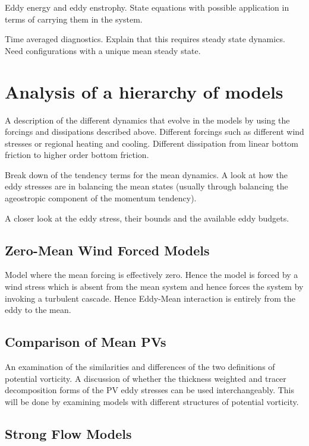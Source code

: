 \documentclass[10pt,a4paper]{article}
\begin{document}
Eddy energy and eddy enstrophy. State equations with 
possible application in terms of carrying them in the system.

Time averaged diagnostics. Explain that this 
requires steady state dynamics. Need configurations
with a unique mean steady state.

\section{Analysis of a hierarchy of models}

A description of the different dynamics that evolve
in the models by using the forcings and 
dissipations described above. Different forcings
such as different wind stresses or regional heating
and cooling. Different dissipation from
linear bottom friction to higher order bottom
friction.

Break down of the tendency terms for the mean
dynamics. A look at how the eddy stresses are 
in balancing the mean states (usually through
balancing the ageostropic component of the
momentum tendency).

A closer look at the eddy stress, their bounds 
and the available eddy budgets.

\subsection{Zero-Mean Wind Forced Models}

Model where the mean forcing is effectively zero. 
Hence the model is forced by a wind stress which is
absent from the mean system and hence forces the
system by 
invoking a turbulent cascade. Hence Eddy-Mean
interaction is entirely from the eddy to the mean.

\subsection{Comparison of Mean PVs}

An examination of the similarities and differences
of the two definitions of potential vorticity. 
A discussion of whether the thickness
weighted and tracer decomposition forms of the
PV eddy stresses can be used interchangeably.
This will be done by examining models with
different structures of potential vorticity.

\subsection{Strong Flow Models}
\end{document}

